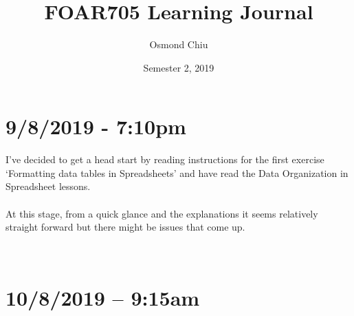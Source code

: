 \documentclass{article}
\title{FOAR705 Learning Journal}
\author{Osmond Chiu}
\date{Semester 2, 2019}
\begin{document}
\maketitle

\section*{9/8/2019 - 7:10pm}
I’ve decided to get a head start by reading instructions for the first exercise ‘Formatting data tables in Spreadsheets’ and have read the Data Organization in Spreadsheet lessons.\\
\\
At this stage, from a quick glance and the explanations it seems relatively straight forward but there might be issues that come up.\par
 
\section*{10/8/2019 – 9:15am}
\end{document}
